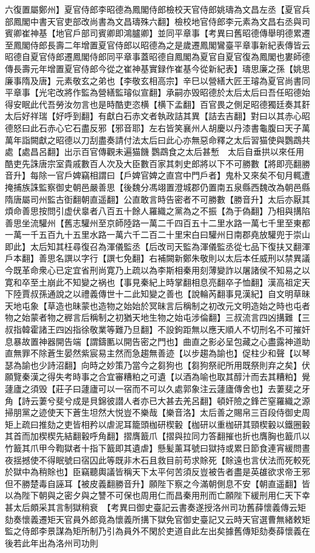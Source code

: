 六復置屬鄭州】夏官侍郎李昭德為鳳閣侍郎檢校天官侍郎姚璹為文昌左丞【夏官兵部鳳閣中書天官吏部改尚書為文昌璹殊六翻】檢校地官侍郎李元素為文昌右丞與司賓卿崔神基【地官戶部司賓卿即鴻臚卿】並同平章事【考異曰舊昭德傳舉明德累遷至鳳閣侍郎長壽二年增置夏官侍郎以昭德為之是歲遷鳳閣鸞臺平章事新紀表傳皆云昭德自夏官侍郎遷鳳閣侍郎同平章事蓋昭德自鳳閣為夏官自夏官復為鳳閣也婁師德傳長壽元年增置夏官侍郎今從之崔神基實録作崔基今從新紀表】璹思廉之孫【姚思廉事隋及唐】元素敬玄之弟也【李敬玄相高宗】辛巳以營繕大匠王璿為夏官尚書同平章事【光宅改將作監為營繕監璿似宣翻】承嗣亦毁昭德於太后太后曰吾任昭德始得安眠此代吾勞汝勿言也是時酷吏恣横【横下孟翻】百官畏之側足昭德獨廷奏其姧太后好祥瑞【好呼到翻】有獻白石赤文者執政詰其異【詰去吉翻】對曰以其赤心昭德怒曰此石赤心它石盡反邪【邪音耶】左右皆笑襄州人胡慶以丹漆書龜腹曰天子萬萬年詣闕獻之昭德以刀刮盡奏請付法太后曰此心亦無惡命釋之太后習猫使與鸚鵡共處【處昌呂翻】出示百官傳觀未遍猫饑鸚鵡食之太后甚慙　太后自垂拱以來任用酷吏先誅唐宗室貴戚數百人次及大臣數百家其刺史郎將以下不可勝數【將即亮翻勝音升】每除一官戶婢竊相謂曰【戶婢官婢之直宫中門戶者】鬼朴又來矣不旬月輒遭掩捕族誅監察御史朝邑嚴善思【後魏分馮翊置澄城郡仍置南五泉縣西魏改為朝邑縣隋唐屬司州監古衘翻朝直遥翻】公直敢言時告密者不可勝數【勝音升】太后亦厭其煩命善思按問引虚伏辠者八百五十餘人羅織之黨為之不振【為于偽翻】乃相與搆陷善思坐流驩州【舊志驩州至京師陸路一萬二千四百五十二里水路一萬七千里至東都一萬一千五百九十五里水路一萬六千二百二十里宋白曰驩州日南郡堯放驩兜于崇山即此】太后知其枉尋復召為渾儀監丞【后改司天監為渾儀監丞從七品下復扶又翻渾戶本翻】善思名譔以字行【譔七免翻】右補闕新鄭朱敬則以太后本任威刑以禁異議今既革命衆心已定宜省刑尚寛乃上疏以為李斯相秦用刻薄變詐以屠諸侯不知易之以寛和卒至土崩此不知變之祸也【事見秦紀上時掌翻相息亮翻卒子恤翻】漢高祖定天下陸賈叔孫通說之以禮義傳世十二此知變之善也【說輪芮翻事見漢紀】自文明草昧天地屯象【草造也昧蒙也造物之始始於冥昧言后稱制之初改元文明造始之時也屯者物之始蒙者物之稺言后稱制之初猶天地生物之始屯涉倫翻】三叔流言四凶搆難【三叔指韓霍諸王四凶指徐敬業等難乃旦翻】不設鉤距無以應天順人不切刑名不可摧奸息暴故置神器開告端【謂鑄匭以開告密之門也】曲直之影必呈包藏之心盡露神道助直無罪不除蒼生晏然紫宸易主然而急趨無善迹【以步趨為諭也】促柱少和聲【以琴瑟為諭也少詩沼翻】向時之妙策乃當今之芻狗也【芻狗祭祀所用既祭則弃之矣】伏願覽秦漢之得失考時事之合宜審糟粕之可遺【以酒為喻也取其醇汁而去其糟粕】覺蘧廬之須毁【莊子曰蘧廬可以一宿而不可以久處郭象注云蘧廬傳舍也】去萋斐之牙角【詩云萋兮斐兮成是貝錦彼譛人者亦已大甚去羌呂翻】頓奸險之鋒芒窒羅織之源掃朋黨之迹使天下蒼生坦然大悦豈不樂哉【樂音洛】太后善之賜帛三百段侍御史周矩上疏曰推劾之吏皆相矜以虐泥耳籠頭枷研楔轂【枷研以重枷研其頸楔轂以鐵圈轂其首而加楔楔先結翻轂呼角翻】摺膺籖爪【摺與拉同力答翻摧也折也膺胸也籖爪以竹籖其爪甲今鞫獄者十指下籖即其遺虐】懸髪薰耳號曰獄持或累日節食連宵緩問晝夜揺撼使不得眠號曰宿囚此等既非木石且救目前苟求賖死【賖遠也言伏法而死較死於獄中為稍賖也】臣竊聽輿議皆稱天下太平何苦須反豈被告者盡是英䧺欲求帝王邪但不勝楚毒自誣耳【被皮義翻勝音升】願陛下察之今滿朝側息不安【朝直遥翻】皆以為陛下朝與之密夕與之讐不可保也周用仁而昌秦用刑而亡願陛下緩刑用仁天下幸甚太后頗采其言制獄稍衰　【考異曰御史臺記云書奏遂授洛州司功舊薛懷義傳云矩劾奏懷義遷矩天官員外郎竟為懷義所搆下獄免官御史臺記又云時天官選曹無緒敕矩監之侍郎李景謀為矩所制乃引為員外不閑於吏道自此左出矣據舊傳矩劾奏薛懷義在後若此年出為洛州司功則